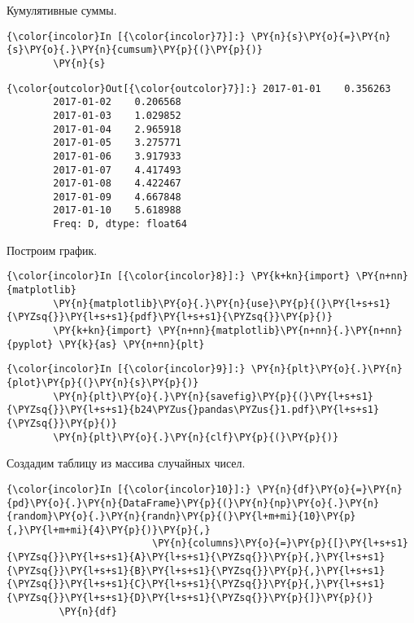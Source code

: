     Кумулятивные суммы.

    \begin{Verbatim}[commandchars=\\\{\}]
{\color{incolor}In [{\color{incolor}7}]:} \PY{n}{s}\PY{o}{=}\PY{n}{s}\PY{o}{.}\PY{n}{cumsum}\PY{p}{(}\PY{p}{)}
        \PY{n}{s}
\end{Verbatim}

            \begin{Verbatim}[commandchars=\\\{\}]
{\color{outcolor}Out[{\color{outcolor}7}]:} 2017-01-01    0.356263
        2017-01-02    0.206568
        2017-01-03    1.029852
        2017-01-04    2.965918
        2017-01-05    3.275771
        2017-01-06    3.917933
        2017-01-07    4.417493
        2017-01-08    4.422467
        2017-01-09    4.667848
        2017-01-10    5.618988
        Freq: D, dtype: float64
\end{Verbatim}
        
    Построим график.

    \begin{Verbatim}[commandchars=\\\{\}]
{\color{incolor}In [{\color{incolor}8}]:} \PY{k+kn}{import} \PY{n+nn}{matplotlib}
        \PY{n}{matplotlib}\PY{o}{.}\PY{n}{use}\PY{p}{(}\PY{l+s+s1}{\PYZsq{}}\PY{l+s+s1}{pdf}\PY{l+s+s1}{\PYZsq{}}\PY{p}{)}
        \PY{k+kn}{import} \PY{n+nn}{matplotlib}\PY{n+nn}{.}\PY{n+nn}{pyplot} \PY{k}{as} \PY{n+nn}{plt}
\end{Verbatim}

    \begin{Verbatim}[commandchars=\\\{\}]
{\color{incolor}In [{\color{incolor}9}]:} \PY{n}{plt}\PY{o}{.}\PY{n}{plot}\PY{p}{(}\PY{n}{s}\PY{p}{)}
        \PY{n}{plt}\PY{o}{.}\PY{n}{savefig}\PY{p}{(}\PY{l+s+s1}{\PYZsq{}}\PY{l+s+s1}{b24\PYZus{}pandas\PYZus{}1.pdf}\PY{l+s+s1}{\PYZsq{}}\PY{p}{)}
        \PY{n}{plt}\PY{o}{.}\PY{n}{clf}\PY{p}{(}\PY{p}{)}
\end{Verbatim}

    Создадим таблицу из массива случайных чисел.

    \begin{Verbatim}[commandchars=\\\{\}]
{\color{incolor}In [{\color{incolor}10}]:} \PY{n}{df}\PY{o}{=}\PY{n}{pd}\PY{o}{.}\PY{n}{DataFrame}\PY{p}{(}\PY{n}{np}\PY{o}{.}\PY{n}{random}\PY{o}{.}\PY{n}{randn}\PY{p}{(}\PY{l+m+mi}{10}\PY{p}{,}\PY{l+m+mi}{4}\PY{p}{)}\PY{p}{,}
                         \PY{n}{columns}\PY{o}{=}\PY{p}{[}\PY{l+s+s1}{\PYZsq{}}\PY{l+s+s1}{A}\PY{l+s+s1}{\PYZsq{}}\PY{p}{,}\PY{l+s+s1}{\PYZsq{}}\PY{l+s+s1}{B}\PY{l+s+s1}{\PYZsq{}}\PY{p}{,}\PY{l+s+s1}{\PYZsq{}}\PY{l+s+s1}{C}\PY{l+s+s1}{\PYZsq{}}\PY{p}{,}\PY{l+s+s1}{\PYZsq{}}\PY{l+s+s1}{D}\PY{l+s+s1}{\PYZsq{}}\PY{p}{]}\PY{p}{)}
         \PY{n}{df}
\end{Verbatim}

